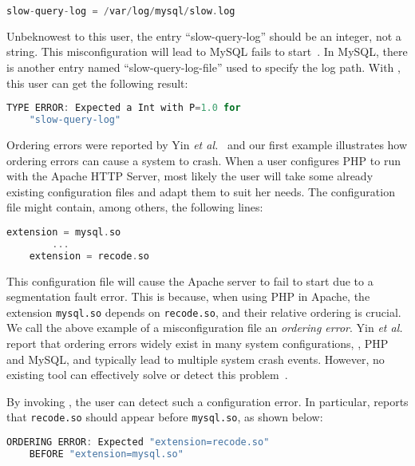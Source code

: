 \begin{lstlisting}[language=C, xleftmargin=.01\textwidth]
    slow-query-log = /var/log/mysql/slow.log
\end{lstlisting} 

Unbeknowest to this user, the entry ``slow-query-log'' should be an 
integer, not a string. This misconfiguration will lead to 
MySQL fails to start~\cite{querylog}. In MySQL, there is another entry 
named ``slow-query-log-file'' used to specify the log path.
With \app, this user can get the following result:

\begin{lstlisting}[language=C, xleftmargin=.01\textwidth]
    TYPE ERROR: Expected a Int with P=1.0 for
    "slow-query-log"
\end{lstlisting} 

Ordering errors were reported by Yin {\em et al.}~\cite{yin11anempirical} and our first
example illustrates how ordering errors can cause a system to crash. When a user configures PHP 
to run with the
Apache HTTP Server, most likely the user will take some already existing configuration files and adapt them
to suit her needs. The configuration file might contain, among others, 
the following lines:

\begin{lstlisting}[language=C, xleftmargin=.01\textwidth]
    extension = mysql.so
        ...
    extension = recode.so
\end{lstlisting}

This configuration file will cause the Apache server to 
fail to start due to a segmentation fault error. 
This is because, when using PHP in Apache, the extension {\tt mysql.so} 
depends on {\tt recode.so}, and their relative ordering
is crucial. 
We call the above example of a misconfiguration file
an {\em ordering error}.
Yin {\em et al.} report that ordering errors widely exist in
many system configurations, \eg, PHP and MySQL,
and typically lead to multiple system crash events.
However, no existing tool can effectively solve 
or detect this problem~\cite{zhang14encore, xu15systems, xu13do}.

By invoking \app, the user can detect such a configuration error.
In particular, \app reports that {\tt recode.so} 
should appear before {\tt mysql.so}, as shown
below:
 
\begin{lstlisting}[language=C, xleftmargin=.01\textwidth]
    ORDERING ERROR: Expected "extension=recode.so"
    BEFORE "extension=mysql.so"
\end{lstlisting} 



